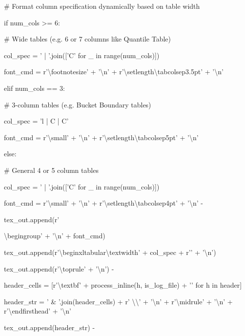 \documentclass[11pt,a4paper]{article}
\begin{document}
\begin{itemize}
\item                \# Format column specification dynamically based on table width
\item                if num\_cols >= 6:
\item                    \# Wide tables (e.g. 6 or 7 columns like Quantile Table)
\item                    col\_spec = ' | '.join(['C' for \_ in range(num\_cols)])
\item                    font\_cmd = r'\textbackslash{}footnotesize' + '\textbackslash{}n' + r'\textbackslash{}setlength{\textbackslash{}tabcolsep}{3.5pt}' + '\textbackslash{}n'
\item                elif num\_cols == 3:
\item                    \# 3-column tables (e.g. Bucket Boundary tables)
\item                    col\_spec = 'l | C | C'
\item                    font\_cmd = r'\textbackslash{}small' + '\textbackslash{}n' + r'\textbackslash{}setlength{\textbackslash{}tabcolsep}{5pt}' + '\textbackslash{}n'
\item                else:
\item                    \# General 4 or 5 column tables
\item                    col\_spec = ' | '.join(['C' for \_ in range(num\_cols)])
\item                    font\_cmd = r'\textbackslash{}small' + '\textbackslash{}n' + r'\textbackslash{}setlength{\textbackslash{}tabcolsep}{4pt}' + '\textbackslash{}n'
-

\item                tex\_out.append(r'{\textbackslash{}begingroup' + '\textbackslash{}n' + font\_cmd)
\item                tex\_out.append(r'\textbackslash{}begin{xltabular}{\textbackslash{}textwidth}{' + col\_spec + r'}' + '\textbackslash{}n')
\item                tex\_out.append(r'\textbackslash{}toprule' + '\textbackslash{}n')
-

\item                header\_cells = [r'\textbackslash{}textbf{' + process\_inline(h, is\_log\_file) + '}' for h in header]
\item                header\_str = ' \& '.join(header\_cells) + r' \textbackslash{}\textbackslash{}' + '\textbackslash{}n' + r'\textbackslash{}midrule' + '\textbackslash{}n' + r'\textbackslash{}endfirsthead' + '\textbackslash{}n'
\item                tex\_out.append(header\_str)
-

}
\end{itemize}
\end{document}
